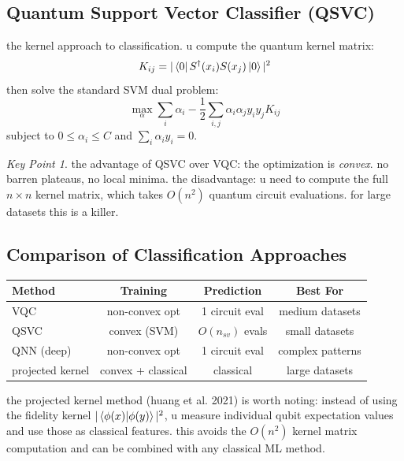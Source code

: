 \documentclass[11pt,a4paper]{article}
\theoremstyle{definition}
\theoremstyle{remark}
\newtheorem*{keypoint}{Key Point}
\begin{document}
\subsection{Quantum Support Vector Classifier (QSVC)}

the kernel approach to classification. u compute the quantum kernel matrix:
\begin{equation}
    K_{ij} = |\bra{0} S^\dagger(x_i) S(x_j) \ket{0}|^2
\end{equation}
then solve the standard SVM dual problem:
\begin{equation}
    \max_{\alpha} \sum_i \alpha_i - \frac{1}{2} \sum_{i,j} \alpha_i \alpha_j y_i y_j K_{ij}
\end{equation}
subject to $0 \leq \alpha_i \leq C$ and $\sum_i \alpha_i y_i = 0$.

\begin{keypoint}
the advantage of QSVC over VQC: the optimization is \emph{convex}. no barren plateaus, no local minima. the disadvantage: u need to compute the full $n \times n$ kernel matrix, which takes $O(n^2)$ quantum circuit evaluations. for large datasets this is a killer.
\end{keypoint}

\subsection{Comparison of Classification Approaches}

\begin{center}
\renewcommand{\arraystretch}{1.3}
\begin{tabular}{|l|c|c|c|}
\hline
\textbf{Method} & \textbf{Training} & \textbf{Prediction} & \textbf{Best For} \\
\hline
VQC & non-convex opt & 1 circuit eval & medium datasets \\
\hline
QSVC & convex (SVM) & $O(n_{sv})$ evals & small datasets \\
\hline
QNN (deep) & non-convex opt & 1 circuit eval & complex patterns \\
\hline
projected kernel & convex + classical & classical & large datasets \\
\hline
\end{tabular}
\end{center}

the projected kernel method (huang et al. 2021) is worth noting: instead of using the fidelity kernel $|\braket{\phi(x)|\phi(y)}|^2$, u measure individual qubit expectation values and use those as classical features. this avoids the $O(n^2)$ kernel matrix computation and can be combined with any classical ML method.
\end{document}
